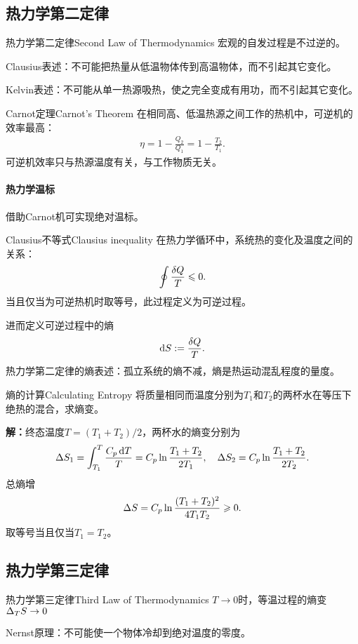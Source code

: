 \subsection{热力学第二定律}
\begin{theorem}{热力学第二定律}{Second Law of Thermodynamics}
	宏观的自发过程是不过逆的。
	\begin{compactitem}
		\item Clausius表述：不可能把热量从低温物体传到高温物体，而不引起其它变化。
		\item Kelvin表述：不可能从单一热源吸热，使之完全变成有用功，而不引起其它变化。
	\end{compactitem}
\end{theorem}
\begin{theorem}{Carnot定理}{Carnot's Theorem}
	在相同高、低温热源之间工作的热机中，可逆机的效率最高：
	\begin{align}
		\eta=1-\frac{Q_2}{Q_1}=1-\frac{T_2}{T_1}.
	\end{align}
	可逆机效率只与热源温度有关，与工作物质无关。
\end{theorem}
\paragraph*{热力学温标}借助Carnot机可实现绝对温标。
\begin{theorem}{Clausius不等式}{Clausius inequality}
	在热力学循环中，系统热的变化及温度之间的关系：
	\begin{equation}
		\oint\frac{\mathop{}\!\delta Q}T\leqslant 0.
	\end{equation}
	当且仅当为可逆热机时取等号，此过程定义为可逆过程。
\end{theorem}
进而定义可逆过程中的熵
\begin{align}
	\mathop{}\!\mathrm{d} S:=\frac{\mathop{}\!\delta Q}T.
\end{align}
热力学第二定律的熵表述：孤立系统的熵不减，熵是热运动混乱程度的量度。
\begin{example}{熵的计算}{Calculating Entropy}
	将质量相同而温度分别为$T_1$和$T_2$的两杯水在等压下绝热的混合，求熵变。

	\textbf{解：}终态温度$T=(T_1+T_2)/2$，两杯水的熵变分别为
	\[
		\Delta S_1=\int_{T_1}^T\frac{C_p\mathop{}\!\mathrm{d} T}T=C_p\ln\frac{T_1+T_2}{2T_1},\quad\Delta S_2=C_p\ln\frac{T_1+T_2}{2T_2}.
	\]
	总熵增
	\[
		\Delta S=C_p\ln\frac{(T_1+T_2)^2}{4T_1T_2}\geqslant 0.
	\]
	取等号当且仅当$T_1=T_2$。
\end{example}
\subsection{热力学第三定律}
\begin{theorem}{热力学第三定律}{Third Law of Thermodynamics}
	$T\to 0$时，等温过程的熵变$\Delta_TS\to 0$

	Nernst原理：不可能使一个物体冷却到绝对温度的零度。
\end{theorem}
\clearpage
